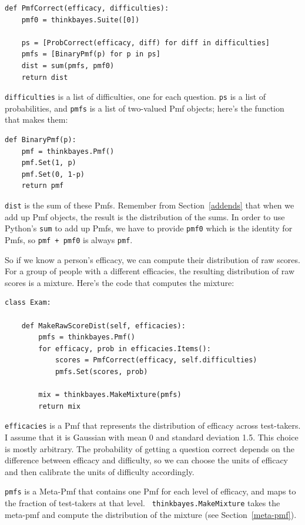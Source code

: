 \documentclass[12pt]{book}
\begin{document}
\begin{verbatim}
def PmfCorrect(efficacy, difficulties):
    pmf0 = thinkbayes.Suite([0])

    ps = [ProbCorrect(efficacy, diff) for diff in difficulties]
    pmfs = [BinaryPmf(p) for p in ps]
    dist = sum(pmfs, pmf0)
    return dist
\end{verbatim}

{\tt difficulties} is a list of difficulties, one for each question.
{\tt ps} is a list of probabilities, and {\tt pmfs} is a list of
two-valued Pmf objects; here's the function that makes them:

\begin{verbatim}
def BinaryPmf(p):
    pmf = thinkbayes.Pmf()
    pmf.Set(1, p)
    pmf.Set(0, 1-p)
    return pmf
\end{verbatim}

{\tt dist} is the sum of these Pmfs.  Remember from Section~\ref{addends}
that when we add up Pmf objects, the result is the distribution
of the sums.  In order to use Python's {\tt sum} to add up Pmfs,
we have to provide {\tt pmf0} which is the identity for Pmfs,
so {\tt pmf + pmf0} is always {\tt pmf}.

So if we know a person's efficacy, we can compute their distribution
of raw scores.  For a group of people with a different efficacies, the
resulting distribution of raw scores is a mixture.  Here's the code
that computes the mixture:

\begin{verbatim}
class Exam:

    def MakeRawScoreDist(self, efficacies):
        pmfs = thinkbayes.Pmf()
        for efficacy, prob in efficacies.Items():
            scores = PmfCorrect(efficacy, self.difficulties)
            pmfs.Set(scores, prob)

        mix = thinkbayes.MakeMixture(pmfs)
        return mix
\end{verbatim}

{\tt efficacies} is a Pmf that represents the distribution of efficacy
across test-takers.  I assume that it is Gaussian with mean 0 and
standard deviation 1.5.  This choice is mostly arbitrary.  The
probability of getting a question correct depends on the difference
between efficacy and difficulty, so we can choose the units of
efficacy and then calibrate the units of difficulty accordingly.

{\tt pmfs} is a Meta-Pmf that contains one Pmf for each level of
efficacy, and maps to the fraction of test-takers at that level.  {\tt
  thinkbayes.MakeMixture} takes the meta-pmf and compute the
distribution of the mixture (see Section~\ref{meta-pmf}).
\end{document}
